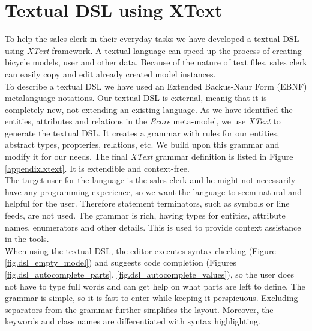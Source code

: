 \section{Textual DSL using XText}
\label{sec.xtext}

\noindent
To help the sales clerk in their everyday tasks we have developed a textual DSL
using \emph{XText} framework. A textual language can speed up the process of
creating bicycle models, user and other data. Because of the nature of text files,
sales clerk can easily copy and edit already created model instances.\\

\noindent
To describe a textual DSL we have used an Extended Backus-Naur Form (EBNF)
metalanguage notations. Our textual DSL is external, meanig that it is
completely new, not extending an existing language. As we have identified the entities,
attributes and relations in the \emph{Ecore} meta-model, we use
\emph{XText} to generate the textual DSL. It creates a grammar with rules for
our entities, abstract types, propteries, relations, etc. We build upon this grammar and modify it for our needs. The final \emph{XText} grammar definition is listed in Figure
\ref{appendix.xtext}. It is extendible and context-free.\\

\noindent
The target user for the language is the sales clerk and he might not
necessarily have any programming experience, so we want the language to seem
natural and helpful for the user. Therefore statement terminators, such as symbols or line feeds, are not
used. The grammar is rich, having types for entities, attribute
names, enumerators and other details. This is used to provide context assistance
in the tools.\\

\noindent
When using the textual DSL, the editor executes syntax checking (Figure
\ref{fig.dsl_empty_model}) and suggests code completion (Figures \ref{fig.dsl_autocomplete_parts},
\ref{fig.dsl_autocomplete_values}), so the user does not have to type full words and can get help on what parts are left to define.
The grammar is simple, so it is fast to enter while keeping it perspicuous.
Excluding separators from the grammar further simplifies the layout.
Moreover, the keywords and class names are differentiated with syntax
highlighting.\\
